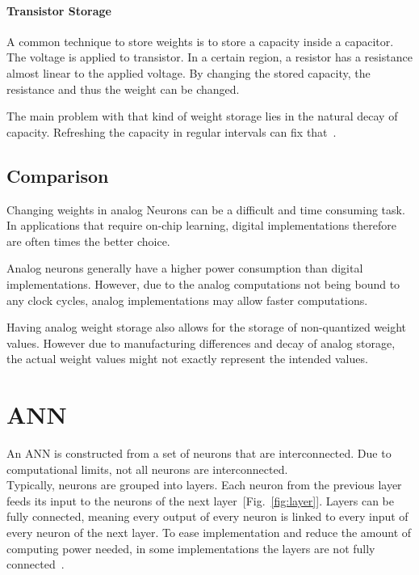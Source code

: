 \documentclass[conference]{IEEEtran}
\begin{document}
    \paragraph{Transistor Storage}
    A common technique to store weights is to store a capacity inside a capacitor.
    The voltage is applied to transistor.
    In a certain region, a resistor has a resistance almost linear to the applied voltage.
    By changing the stored capacity, the resistance and thus the weight can be changed.

    The main problem with that kind of weight storage lies in the natural decay of capacity.
    Refreshing the capacity in regular intervals can fix that~\cite{reed1989multiple}.

    \subsection{Comparison}

    Changing weights in analog Neurons can be a difficult and time consuming task.
    In applications that require on-chip learning, digital implementations therefore are often times the better choice.

    Analog neurons generally have a higher power consumption than digital implementations.
    However, due to the analog computations not being bound to any clock cycles, analog implementations may allow faster computations.

    Having analog weight storage also allows for the storage of non-quantized weight values.
    However due to manufacturing differences and decay of analog storage, the actual weight values might not exactly represent the intended values.

    \section{ANN}


    An ANN is constructed from a set of neurons that are interconnected.
    Due to computational limits, not all neurons are interconnected. \\
    Typically, neurons are grouped into layers.
    Each neuron from the previous layer feeds its input to the neurons of the next layer~[Fig.~\ref{fig:layer}].
    Layers can be fully connected, meaning every output of every neuron is linked to every input of every neuron of the next layer.
    To ease implementation and reduce the amount of computing power needed, in some implementations the layers are not fully connected~\cite{boser1991analog}.
\end{document}
